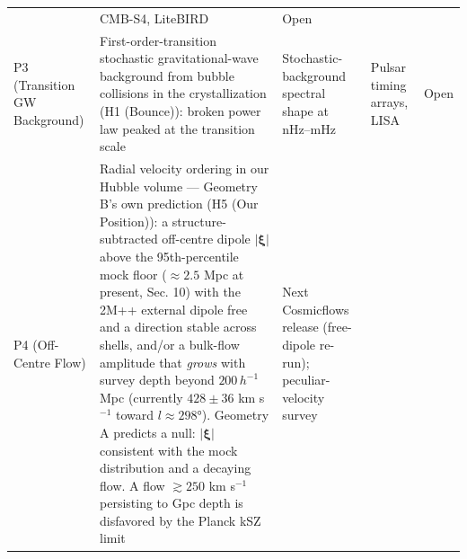 \documentclass[
]{article}
\begin{document}
\begin{longtable}[]{@{}lllll@{}}
\begin{minipage}[t]{0.19\columnwidth}
\end{minipage} & \begin{minipage}[t]{0.19\columnwidth}\raggedright
CMB-S4, LiteBIRD\strut
\end{minipage} & \begin{minipage}[t]{0.19\columnwidth}\raggedright
Open\strut
\end{minipage}\tabularnewline
\begin{minipage}[t]{0.11\columnwidth}\raggedright
P3 (Transition GW Background)\strut
\end{minipage} & \begin{minipage}[t]{0.19\columnwidth}\raggedright
First-order-transition stochastic gravitational-wave background from
bubble collisions in the crystallization (H1 (Bounce)): broken power law
peaked at the transition scale\strut
\end{minipage} & \begin{minipage}[t]{0.19\columnwidth}\raggedright
Stochastic-background spectral shape at nHz--mHz\strut
\end{minipage} & \begin{minipage}[t]{0.19\columnwidth}\raggedright
Pulsar timing arrays, LISA\strut
\end{minipage} & \begin{minipage}[t]{0.19\columnwidth}\raggedright
Open\strut
\end{minipage}\tabularnewline
\begin{minipage}[t]{0.11\columnwidth}\raggedright
P4 (Off-Centre Flow)\strut
\end{minipage} & \begin{minipage}[t]{0.19\columnwidth}\raggedright
Radial velocity ordering in our Hubble volume --- Geometry B's own
prediction (H5 (Our Position)): a structure-subtracted off-centre dipole
\(|\boldsymbol{\xi}|\) above the 95th-percentile mock floor
(\(\approx 2.5\) Mpc at present, Sec. 10) with the 2M++ external dipole
free and a direction stable across shells, and/or a bulk-flow amplitude
that \emph{grows} with survey depth beyond \(200\,h^{-1}\) Mpc
(currently \(428 \pm 36\) km s\(^{-1}\) toward \(l \approx 298°\)).
Geometry A predicts a null: \(|\boldsymbol{\xi}|\) consistent with the
mock distribution and a decaying flow. A flow \(\gtrsim 250\) km
s\(^{-1}\) persisting to Gpc depth is disfavored by the Planck kSZ
limit\strut
\end{minipage} & \begin{minipage}[t]{0.19\columnwidth}\raggedright
Next Cosmicflows release (free-dipole re-run); peculiar-velocity survey

\end{minipage}
\end{longtable}
\end{document}
